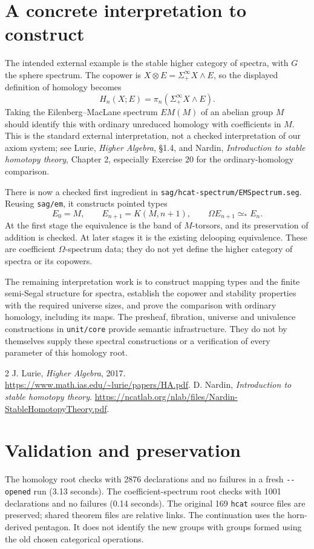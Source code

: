 \documentclass[11pt]{amsart}
\newcommand{\code}[1]{\nolinkurl{#1}}
\begin{document}
\section{A concrete interpretation to construct}
The intended external example is the stable higher category of spectra,
with $G$ the sphere spectrum. The copower is
$X\otimes E=\Sigma^\infty_+X\wedge E$, so the displayed definition of
homology becomes
\[
 H_n(X;E)=\pi_n(\Sigma^\infty_+X\wedge E).
\]
Taking the Eilenberg--MacLane spectrum $EM(M)$ of an abelian group $M$
should identify this with ordinary unreduced homology with coefficients
in $M$. This is the standard external interpretation, not a checked
interpretation of our axiom system; see Lurie, \emph{Higher Algebra},
\S1.4, and Nardin, \emph{Introduction to stable homotopy theory},
Chapter 2, especially Exercise 20 for the ordinary-homology comparison.

There is now a checked first ingredient in
\code{sag/hcat-spectrum/EMSpectrum.seg}. Reusing \code{sag/em}, it
constructs pointed types
\[
 E_0=M,\qquad E_{n+1}=K(M,n+1),\qquad
 \Omega E_{n+1}\simeq_* E_n.
\]
At the first stage the equivalence is the band of $M$-torsors, and
its preservation of addition is checked. At later stages it is the
existing delooping equivalence. These are coefficient
$\Omega$-spectrum data; they do not yet define the higher category of
spectra or its copowers.

The remaining interpretation work is to construct mapping types and
the finite semi-Segal structure for spectra, establish the copower and
stability properties with the required universe sizes, and prove the
comparison with ordinary homology, including its maps. The presheaf,
fibration, universe and univalence constructions in \code{unit/core}
provide semantic infrastructure. They do not by themselves supply these
spectral constructions or a verification of every parameter of this
homology root.

\begin{thebibliography}{2}
 J. Lurie, \emph{Higher Algebra}, 2017.
\url{https://www.math.ias.edu/~lurie/papers/HA.pdf}.
 D. Nardin, \emph{Introduction to stable homotopy theory}.
\url{https://ncatlab.org/nlab/files/Nardin-StableHomotopyTheory.pdf}.
\end{thebibliography}

\section{Validation and preservation}
The homology root checks with 2876 declarations and no failures in a fresh
\code{--opened} run (3.13 seconds). The coefficient-spectrum root checks
with 1001 declarations and no failures (0.14 seconds).
The original 169 \code{hcat} source files are preserved; shared theorem
files are relative links. The continuation uses the horn-derived
pentagon. It does not identify the new groups
with groups formed using the old chosen categorical operations.
\end{document}

